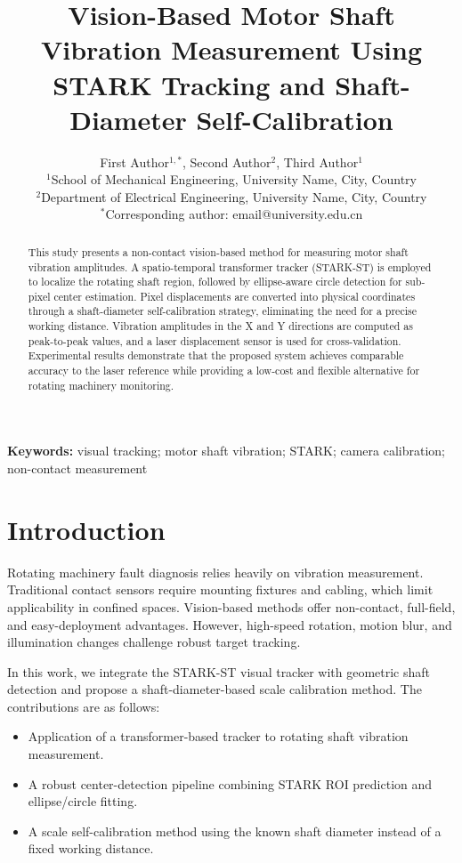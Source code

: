 \documentclass[12pt,a4paper]{article}
\title{Vision-Based Motor Shaft Vibration Measurement Using STARK Tracking and Shaft-Diameter Self-Calibration}
\author{First Author$^{1,*}$, Second Author$^{2}$, Third Author$^{1}$ \\
\small $^{1}$School of Mechanical Engineering, University Name, City, Country \\
\small $^{2}$Department of Electrical Engineering, University Name, City, Country \\
\small $^{*}$Corresponding author: email@university.edu.cn}
\date{}
\begin{document}
\maketitle

\begin{abstract}
\noindent
This study presents a non-contact vision-based method for measuring motor shaft vibration amplitudes.
A spatio-temporal transformer tracker (STARK-ST) is employed to localize the rotating shaft region,
followed by ellipse-aware circle detection for sub-pixel center estimation.
Pixel displacements are converted into physical coordinates through a shaft-diameter self-calibration strategy,
eliminating the need for a precise working distance.
Vibration amplitudes in the X and Y directions are computed as peak-to-peak values,
and a laser displacement sensor is used for cross-validation.
Experimental results demonstrate that the proposed system achieves comparable accuracy to the laser reference
while providing a low-cost and flexible alternative for rotating machinery monitoring.
\end{abstract}

\vspace{0.5em}
\noindent\textbf{Keywords:} visual tracking; motor shaft vibration; STARK; camera calibration; non-contact measurement

\section{Introduction}
Rotating machinery fault diagnosis relies heavily on vibration measurement.
Traditional contact sensors require mounting fixtures and cabling, which limit applicability in confined spaces.
Vision-based methods offer non-contact, full-field, and easy-deployment advantages.
However, high-speed rotation, motion blur, and illumination changes challenge robust target tracking.

In this work, we integrate the STARK-ST visual tracker with geometric shaft detection
and propose a shaft-diameter-based scale calibration method.
The contributions are as follows:
\begin{itemize}
    \item Application of a transformer-based tracker to rotating shaft vibration measurement.
    \item A robust center-detection pipeline combining STARK ROI prediction and ellipse/circle fitting.
    \item A scale self-calibration method using the known shaft diameter instead of a fixed working distance.
\end{itemize}
\end{document}
